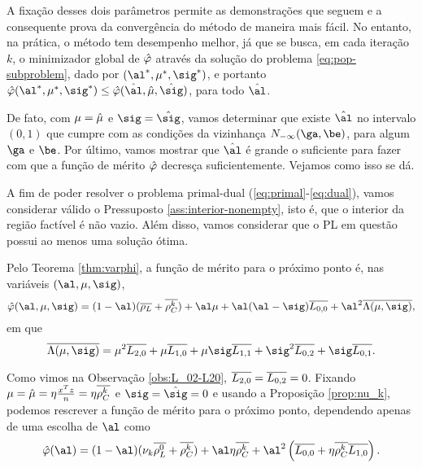  A fixação desses dois parâmetros permite as demonstrações que seguem e a consequente prova da convergência do método de maneira mais fácil. No entanto, na prática, o método  tem desempenho melhor, já que se busca, em cada iteração $k$,
o minimizador global de $\hat{\varphi}$ através da solução do problema \eqref{eq:pop-subproblem}, dado por $(\al^*,\mu^*,\sig^*)$, e portanto	$\nextphi(\al^*,\mu^*,\sig^*)\leq \nextphi(\hat{\al},\nextmu,\nextsig)$, para todo   $\hat{\al}$.

De fato, com $\mu=\hat{\mu}$ e $\sig=\nextsig$, vamos determinar que existe $\nextal$  no intervalo $(0,1)$ que cumpre com as condições da vizinhança $N_{-\infty}(\ga,\be)$, para algum $\ga$ e $\be$.  Por último, vamos mostrar que $\nextal$ é grande o suficiente para fazer com que a função de mérito $\hat{\varphi}$ decresça suficientemente. Vejamos como isso se dá.




A fim de poder  resolver o problema primal-dual (\ref{eq:primal}-\ref{eq:dual}), vamos considerar válido o Pressuposto \ref{ass:interior-nonempty}, isto é, que o interior da região factível é não vazio. Além disso, vamos considerar que o \ac{PL} em questão possui ao menos uma solução ótima. 





Pelo Teorema \ref{thm:varphi}, a função de mérito para o próximo ponto   é, nas variáveis  $(\al,\mu,\sig)$,
\begin{equation*}
{\nextphi}(\al,\mu,\sig) =  (1-\al)(\dbvec{\rho_L} +
\rhoCkb ) + \al\mu + \al(\al-\sig)\dbvec{L_{0,0}} +
\al^2\dbvec{\Lambda(\mu,\sig)} ,
\end{equation*}
em que 
\[
\dbvec{\Lambda(\mu,\sig)} = \mu^2
 \dbvec{L_{2,0}} + \mu \dbvec{L_{1,0}} + 	\mu \sig \dbvec{L_{1,1}} +
 \sig^2 \dbvec{L_{0,2}} + \sig \dbvec{L_{0,1}}.
 \]


Como vimos na Observação \ref{obs:L_02-L20},  $\overline{L_{2,0}} = \overline{L_{0,2}} = 0$. Fixando $\mu = \hat{\mu} = \eta\frac{x^Tz}{n} = \eta\overline{\rho_C^{k}}  $
 e $\sig = \nextsig=0$ e usando a Proposição \ref{prop:nu_k},   podemos rescrever a função de mérito para o próximo ponto, dependendo apenas de uma escolha de  $\al$ como
\begin{equation}
	\label{eq:simplified-merit-function-al}
\nextphi(\al)  = (1-\al)(\nuk \dbvec{\rho_L^{0}} +
\rhoCkb ) + \al\eta\rhoCkb  + \al^2\left(\dbvec{L_{0,0}} + \eta\rhoCkb  \dbvec{L_{1,0}}
\right) .
\end{equation}

